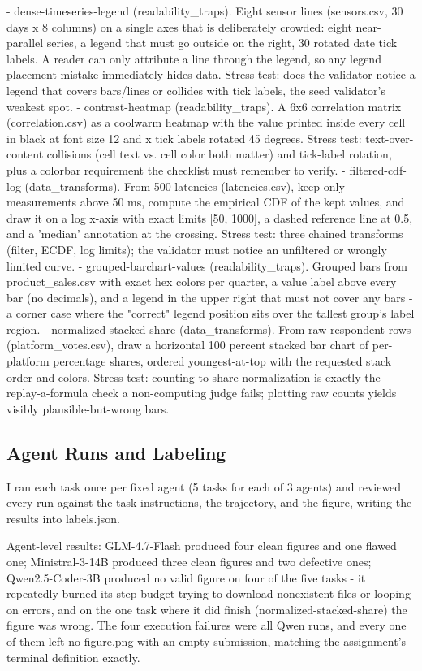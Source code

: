 \documentclass[11pt]{article}
\begin{document}
- dense-timeseries-legend (readability_traps). Eight sensor lines (sensors.csv, 30 days x 8 columns) on a single axes that is deliberately crowded: eight near-parallel series, a legend that must go outside on the right, 30 rotated date tick labels. A reader can only attribute a line through the legend, so any legend placement mistake immediately hides data. Stress test: does the validator notice a legend that covers bars/lines or collides with tick labels, the seed validator's weakest spot.
- contrast-heatmap (readability_traps). A 6x6 correlation matrix (correlation.csv) as a coolwarm heatmap with the value printed inside every cell in black at font size 12 and x tick labels rotated 45 degrees. Stress test: text-over-content collisions (cell text vs. cell color both matter) and tick-label rotation, plus a colorbar requirement the checklist must remember to verify.
- filtered-cdf-log (data_transforms). From 500 latencies (latencies.csv), keep only measurements above 50 ms, compute the empirical CDF of the kept values, and draw it on a log x-axis with exact limits [50, 1000], a dashed reference line at 0.5, and a 'median' annotation at the crossing. Stress test: three chained transforms (filter, ECDF, log limits); the validator must notice an unfiltered or wrongly limited curve.
- grouped-barchart-values (readability_traps). Grouped bars from product_sales.csv with exact hex colors per quarter, a value label above every bar (no decimals), and a legend in the upper right that must not cover any bars - a corner case where the "correct" legend position sits over the tallest group's label region.
- normalized-stacked-share (data_transforms). From raw respondent rows (platform_votes.csv), draw a horizontal 100 percent stacked bar chart of per-platform percentage shares, ordered youngest-at-top with the requested stack order and colors. Stress test: counting-to-share normalization is exactly the replay-a-formula check a non-computing judge fails; plotting raw counts yields visibly plausible-but-wrong bars.

\subsection{Agent Runs and Labeling}
I ran each task once per fixed agent (5 tasks for each of 3 agents) and reviewed every run against the task instructions, the trajectory, and the figure, writing the results into labels.json.

Agent-level results: GLM-4.7-Flash produced four clean figures and one flawed one; Ministral-3-14B produced three clean figures and two defective ones; Qwen2.5-Coder-3B produced no valid figure on four of the five tasks - it repeatedly burned its step budget trying to download nonexistent files or looping on errors, and on the one task where it did finish (normalized-stacked-share) the figure was wrong. The four execution failures were all Qwen runs, and every one of them left no figure.png with an empty submission, matching the assignment's terminal definition exactly.
\end{document}

